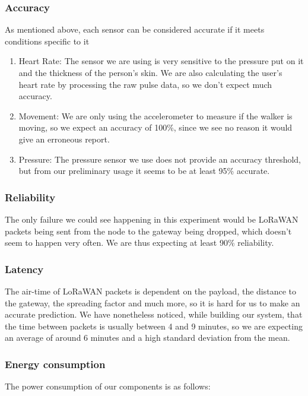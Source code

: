 		\subsubsection*{Accuracy}
			As mentioned above, each sensor can be considered accurate if it meets conditions specific to it 

			\begin{enumerate}
				\item Heart Rate: The sensor we are using is very sensitive to the pressure put on it and the thickness of the person's skin. We are also calculating the user's heart rate by processing the raw pulse data, so we don't expect much accuracy.
				\item Movement: We are only using the accelerometer to measure if the walker is moving, so we expect an accuracy of 100\%, since we see no reason it would give an erroneous report.
				\item Pressure: The pressure sensor we use does not provide an accuracy threshold, but from our preliminary usage it seems to be at least 95\% accurate.
			\end{enumerate}

		\subsubsection*{Reliability}
			The only failure we could see happening in this experiment would be LoRaWAN packets being sent from the node to the gateway being dropped, which doesn't seem to happen very often. We are thus expecting at least 90\% reliability. 

		\subsubsection*{Latency}
			The air-time of LoRaWAN packets is dependent on the payload, the distance to the gateway, the spreading factor and much more, so it is hard for us to make an accurate prediction. We have nonetheless noticed, while building our system, that the time between packets is usually between 4 and 9 minutes, so we are expecting an average of around 6 minutes and a high standard deviation from the mean.
		\newline
		\newline
		\newline
		\subsubsection*{Energy consumption}
			The power consumption of our components is as follows:

